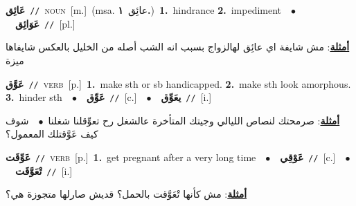 \documentclass[10pt,a4paper,twoside]{article} %
\begin{document}
\begin{multicols}{2}
{\setlength\topsep{0pt}\textbf{\foreignlanguage{arabic}{عَائِق}}\ {\color{gray}\texttt{//}\color{black}}\ \textsc{noun}\ [m.]\ \color{gray}(msa. \foreignlanguage{arabic}{عائِق}~\foreignlanguage{arabic}{\textbf{١.}})\color{black}\ \textbf{1.}~hindrance  \textbf{2.}~impediment\ \ $\bullet$\ \ \setlength\topsep{0pt}\textbf{\foreignlanguage{arabic}{عَوَائِق}}\ {\color{gray}\texttt{//}\color{black}}\ [pl.]\  \begin{flushright}\color{gray}\foreignlanguage{arabic}{\textbf{\underline{\foreignlanguage{arabic}{أمثلة}}}: مش شايفة اي عائِق لهالزواج بسبب انه الشب أصله من الخليل  بالعكس شايفاها ميزة}\end{flushright}\color{black}} \vspace{2mm}

{\setlength\topsep{0pt}\textbf{\foreignlanguage{arabic}{عَوَّق}}\ {\color{gray}\texttt{//}\color{black}}\ \textsc{verb}\ [p.]\ \textbf{1.}~make sth or sb handicapped.  \textbf{2.}~make sth look amorphous.  \textbf{3.}~hinder sth\ \ $\bullet$\ \ \setlength\topsep{0pt}\textbf{\foreignlanguage{arabic}{عَوِّق}}\ {\color{gray}\texttt{//}\color{black}}\ [c.]\ \ $\bullet$\ \ \setlength\topsep{0pt}\textbf{\foreignlanguage{arabic}{يعَوِّق}}\ {\color{gray}\texttt{//}\color{black}}\ [i.]\  \begin{flushright}\color{gray}\foreignlanguage{arabic}{\textbf{\underline{\foreignlanguage{arabic}{أمثلة}}}: صرمحتك لنصاص الليالي وجيتك المتأخرة عالشغل رح تعوِّقلنا شغلنا\ $\bullet$\ \  شوف كيف عَوَّقتلك المعمول؟}\end{flushright}\color{black}} \vspace{2mm}

{\setlength\topsep{0pt}\textbf{\foreignlanguage{arabic}{عَوِّقَت}}\ {\color{gray}\texttt{//}\color{black}}\ \textsc{verb}\ [p.]\ \textbf{1.}~get pregnant after a very long time\ \ $\bullet$\ \ \setlength\topsep{0pt}\textbf{\foreignlanguage{arabic}{عَوْقِي}}\ {\color{gray}\texttt{//}\color{black}}\ [c.]\ \ $\bullet$\ \ \setlength\topsep{0pt}\textbf{\foreignlanguage{arabic}{تْعَوَّقَت}}\ {\color{gray}\texttt{//}\color{black}}\ [i.]\  \begin{flushright}\color{gray}\foreignlanguage{arabic}{\textbf{\underline{\foreignlanguage{arabic}{أمثلة}}}: مش كأنها تْعَوَّقت بالحمل؟ قديش صارلها متجوزة هي؟}\end{flushright}\color{black}} \vspace{2mm}


\end{multicols}
\end{document}
